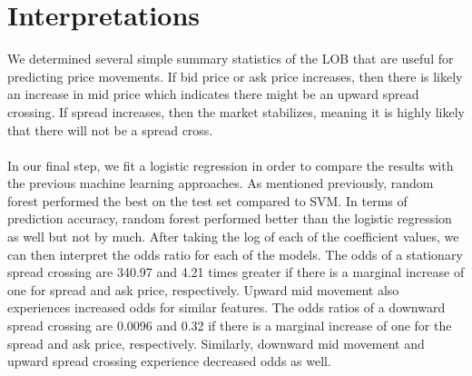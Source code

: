 \documentclass[11pt]{article}
\begin{document}
\section{Interpretations}
We determined several simple summary statistics of the LOB that are useful for predicting price movements. If bid price or ask price increases, then there is likely an increase in mid price which indicates there might be an upward spread crossing. If spread increases, then the market stabilizes, meaning it is highly likely that there will not be a spread cross.\\ 
\\
In our final step, we fit a logistic regression in order to compare the results with the previous machine learning approaches. As mentioned previously, random forest performed the best on the test set compared to SVM. In terms of prediction accuracy, random forest performed better than the logistic regression as well but not by much. After taking the log of each of the coefficient values, we can then interpret the odds ratio for each of the models. The odds of a stationary spread crossing are 340.97 and 4.21 times greater if there is a marginal increase of one for spread and ask price, respectively. Upward mid movement also experiences increased odds for similar features. The odds ratios of a downward spread crossing are 0.0096 and 0.32 if there is a marginal increase of one for the spread and ask price, respectively. Similarly, downward mid movement and upward spread crossing experience decreased odds as well. 
\end{document}
